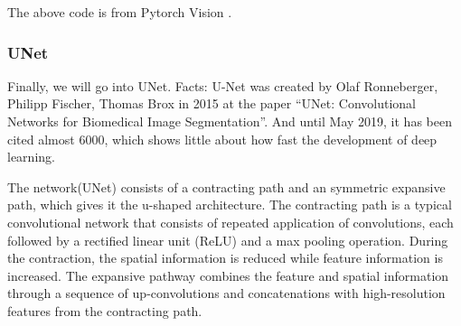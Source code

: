 \documentclass[letterpaper,10pt,english]{sphinxmanual}
\begin{document}
\begin{sphinxVerbatim}[commandchars=\\\{\}]
         

      
          
          
          
          

          
          
          
          

          
           
          

         
\end{sphinxVerbatim}

The above code is from Pytorch Vision  .


\subsubsection{UNet}
\label{\detokenize{usage/quickstart:unet}}
Finally, we will go into UNet. Facts: U-Net was created by Olaf Ronneberger, Philipp Fischer, Thomas Brox in 2015 at the paper “UNet: Convolutional Networks for Biomedical Image Segmentation”. And until May 2019, it has been cited almost 6000, which shows little about how fast the development of deep learning.

The network(UNet) consists of a contracting path and an symmetric expansive path, which gives it the u-shaped architecture. The contracting path is a typical convolutional network that consists of repeated application of convolutions, each followed by a rectified linear unit (ReLU) and a max pooling operation. During the contraction, the spatial information is reduced while feature information is increased. The expansive pathway combines the feature and spatial information through a sequence of up-convolutions and concatenations with high-resolution features from the contracting path.
\end{document}
